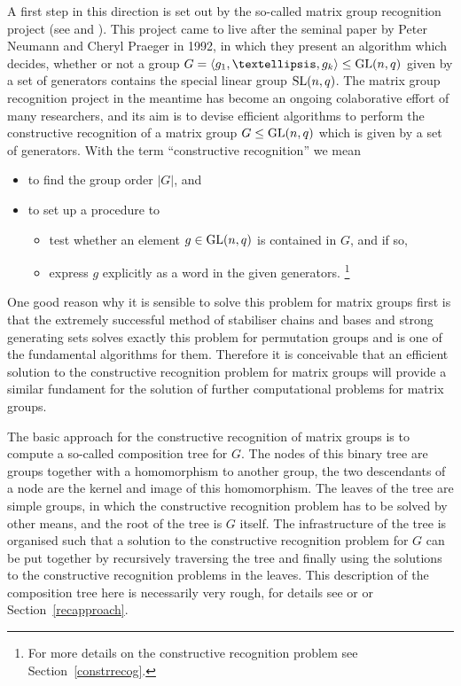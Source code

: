 A first step in this direction is set out by the so-called matrix group
recognition project (see \cite{MatGrpProj} and \cite{OB}). This project
came to live after the seminal paper \cite{neumann-praeger} by Peter Neumann 
and Cheryl Praeger in 1992, in which they present an algorithm which decides,
whether or not a group $G = \left< g_1, \ldots, g_k\right> \le \GL(n,q)$
given by a set of generators contains the special linear group $\SL(n,q)$.
The matrix group recognition project in the meantime has become an ongoing 
colaborative effort of many researchers, and its aim
is to devise efficient algorithms to perform the constructive recognition
of a matrix group $G \le \GL(n,q)$ which is given by a set of generators. 
With the term ``constructive recognition'' we mean
\begin{itemize}
\setlength{\itemsep}{0pt}\setlength{\parskip}{0pt}
\item to find the group order $|G|$, and
\item to set up a procedure to 
\begin{itemize}
\setlength{\itemsep}{0pt}\setlength{\parskip}{0pt}
\item test whether an element $g \in \GL(n,q)$ is contained in $G$, and if so,
\item express $g$ explicitly as a word in the given generators.%
\footnote{For more details on the constructive recognition problem see
Section~\ref{constrrecog}.}
\end{itemize}
\end{itemize}
One good reason why it is sensible to solve this problem for matrix groups
first is that the extremely successful method of stabiliser chains and
bases and strong generating sets solves exactly
this problem for permutation groups and is one of the fundamental
algorithms for them. Therefore it is conceivable that an efficient solution
to the constructive recognition problem for matrix groups will provide a
similar fundament for the solution of further computational problems for
matrix groups.

The basic approach for the constructive recognition of matrix groups is
to compute a so-called composition tree for $G$. The nodes of this binary 
tree are groups together with a homomorphism to another group, the two
descendants of a node are the kernel and image of this homomorphism. The
leaves of the tree are simple groups, in which the constructive recognition
problem has to be solved by other means, and the root of the tree is $G$
itself. The infrastructure of the tree is organised such that a solution to
the constructive recognition problem for $G$ can be put together
by recursively traversing the tree and finally using the solutions to the
constructive recognition problems in the leaves. This description of the
composition tree here is
necessarily very rough, for details see \cite{MatGrpProj} or \cite{OB}
or Section~\ref{recapproach}.

